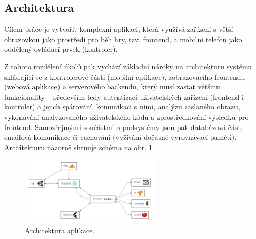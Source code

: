 \subsection{Architektura}

Cílem práce je vytvořit komplexní aplikaci, která využívá zařízení s větší obrazovkou jako prostředí pro běh hry, tzv. frontend, a mobilní telefon jako oddělený ovládací prvek (kontroler). \par
Z tohoto rozdělení úkolů pak vychází základní nároky na architekturu systému skládající se z kontrolerové části (mobilní aplikace), zobrazovacího frontendu (webová aplikace) a serverového backendu, který musí zastat většinu funkcionality – především tedy autentizaci uživatelských zařízení (frontend i kontroler) a jejich spárování, komunikaci s nimi, analýzu zaslaného obrazu, vykonávání analyzovaného uživatelského kódu a zprostředkování výsledků pro frontend. Samozřejmými součástmi a podsystémy jsou pak databázová část, emailová komunikace či cachování (vyžívání dočasné vyrovnávací paměti). Architekturu názorně shrnuje schéma na obr. \ref{fig:architektura}

\begin{figure}[h]
    \centering
    \includegraphics[width=0.6\textwidth]{img/architektura.jpg}
    \caption{Architektura aplikace.}
    \label{fig:architektura}
\end{figure}
